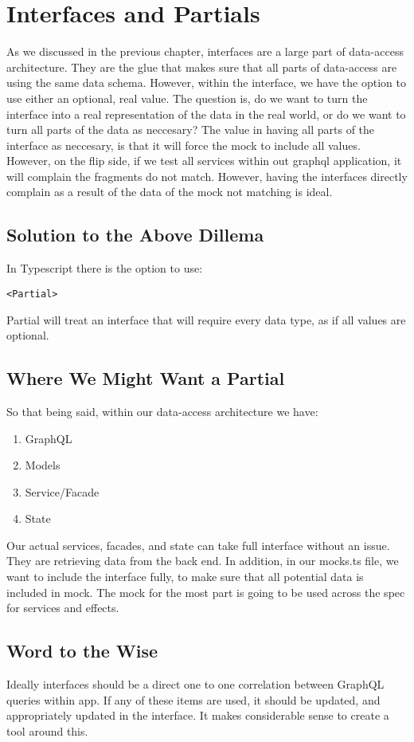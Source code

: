 \maketitle{}
\section{ Interfaces and Partials }

As we discussed in the previous chapter, interfaces are a large part of
data-access architecture. They are the glue that makes sure that all parts of
data-access are using the same data schema. However, within the interface, we
have the option to use either an optional, real value. The question is, do we
want to turn the interface into a real representation of the data in the real
world, or do we want to turn all parts of the data as neccesary? The value in
having all parts of the interface as neccesary, is that it will force the mock
to include all values. However, on the flip side, if we test all services within
out graphql application, it will complain the fragments do not match. However,
having the interfaces directly complain as a result of the data of the mock
not matching is ideal.

\subsection{Solution to the Above Dillema}
In Typescript there is the option to use:
\begin{verbatim}
<Partial>
\end{verbatim}
Partial will treat an interface that will require every data type, as if
all values are optional.

\subsection{Where We Might Want a Partial}
So that being said, within our data-access architecture we have:
\begin{enumerate}
  \item GraphQL
  \item Models
  \item Service/Facade
  \item State
\end{enumerate}

Our actual services, facades, and state can take full interface without an
issue. They are retrieving data from the back end. In addition, in our mocks.ts
file, we want to include the interface fully, to make sure that all potential
data is included in mock. The mock for the most part is going to be used across
the spec for services and effects.

\subsection{Word to the Wise}
Ideally interfaces should be a direct one to one correlation between GraphQL
queries within app. If any of these items are used, it should be updated, and
appropriately updated in the interface. It makes considerable sense to create a
tool around this.
